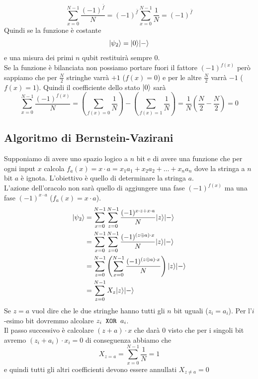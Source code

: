 \documentclass[12pt, a4paper]{report}
\begin{document}
\begin{equation*}
    \sum_{x=0}^{N-1} \frac{(-1)^{\bar{f}}}{N} = (-1)^{\bar{f}}\sum_{x=0}^{N-1} \frac{1}{N} = (-1)^{\bar{f}}
\end{equation*}
Quindi se la funzione è costante
\begin{equation*}
    | \psi_{2} \rangle = | 0 \rangle| - \rangle
\end{equation*}
e una misura dei primi $n$ qubit restituirà sempre 0.\\
Se la funzione è bilanciata non possiamo portare fuori il fattore $(-1)^{f(x)}$ però sappiamo che per $\frac{N}{2}$ stringhe varrà $+1$ ($f(x)=0$) e per le altre $\frac{N}{2}$ varrà $-1$ ($f(x)=1$). Quindi il coefficiente dello stato $| 0 \rangle$ sarà
\begin{equation*}
    \sum_{x=0}^{N-1} \frac{(-1)^{f(x)}}{N} = \left(\sum_{f(x)=0}\frac{1}{N}\right)-\left(\sum_{f(x)=1}\frac{1}{N}\right) = \frac{1}{N}\left(\frac{N}{2}-\frac{N}{2}\right) = 0
\end{equation*}
\subsection{Algoritmo di Bernstein-Vazirani}
Supponiamo di avere uno spazio logico a $n$ bit e di avere una funzione che per ogni input $x$ calcola $f_{a}(x)=x\cdot a = x_{1}a_{1}+x_{2}a_{2}+\ldots+x_{n}a_{n}$ dove la stringa a $n$ bit $a$ è ignota. L'obiettivo è quello di determinare la stringa $a$.\\
L'azione dell'oracolo non sarà quello di aggiungere una fase $(-1)^{f(x)}$ ma una fase $(-1)^{x\cdot a}$ ($f_{a}(x)=x\cdot a$).
\begin{equation*}
    \begin{split}
        | \psi_{2} \rangle &= \sum_{x=0}^{N-1}\sum_{z=0}^{N-1} \frac{(-1)^{x\cdot z+x\cdot a}}{N}| z \rangle| - \rangle \\
        &= \sum_{x=0}^{N-1}\sum_{z=0}^{N-1} \frac{(-1)^{(z\oplus a)\cdot x}}{N}| z \rangle| - \rangle \\
        &= \sum_{z=0}^{N-1}\left(\sum_{x=0}^{N-1} \frac{(-1)^{(z\oplus a)\cdot x}}{N}\right)| z \rangle| - \rangle \\
        &= \sum_{z=0}^{N-1}X_{z}| z \rangle| - \rangle
    \end{split}
\end{equation*}
Se $z=a$ vuol dire che le due stringhe hanno tutti gli $n$ bit uguali ($z_{i}=a_{i}$). Per l'$i$-esimo bit dovremmo alcolare $z_{i}\text{\texttt{ XOR }}a_{i}$.\\
Il passo successivo è calcolare $(z+a)\cdot x$ che darà 0 visto che per i singoli bit avremo $(z_{i}+a_{i})\cdot x_{i}=0$ di conseguenza abbiamo che 
\begin{equation*}
    X_{z=a}=\sum_{x=0}^{N-1} \frac{1}{N} = 1
\end{equation*}
e quindi tutti gli altri coefficienti devono essere annullati $X_{z\neq a}=0$
\end{document}
